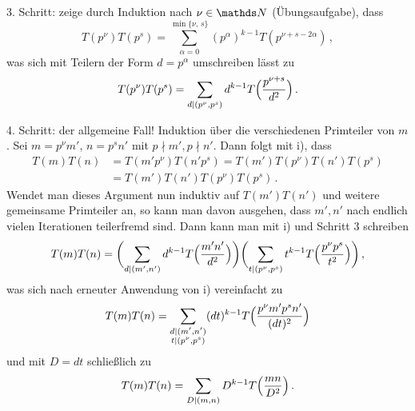 \begin{bewe}
	3. Schritt: zeige durch Induktion nach $\nu \in \NN$ (Übungsaufgabe), dass 
	\[
	T(p^\nu) T(p^s) = \sum_{\alpha = 0}^{\min \{\nu,\,s\}} (p^\alpha)^{k-1} T(p^{\nu + s - 2\alpha})
	\,,
	\]
	was sich mit Teilern der Form $d = p^\alpha$ umschreiben lässt zu
	\[
	T(p^\nu) T(p^s) = \sum_{d \vert (p^\nu, p^s)} d^{k-1} T\Bigl(\frac{p^{\nu + s}}{d^2}\Bigr)
	\,.
	\]
	
	4. Schritt: der allgemeine Fall! Induktion über die verschiedenen Primteiler von $m$. Sei $m = p^\nu m'$, $n = p^s n'$ mit $p \nmid m', p \nmid n'$. Dann folgt mit i), dass
	\begin{align*}
	T(m)T(n)
	&= T(m'p^\nu) T(n'p^s)
	= T(m')T(p^\nu)T(n')T(p^s) \\
	&= T(m')T(n') T(p^\nu) T(p^s)
	\,.
	\end{align*}
	Wendet man dieses Argument nun induktiv auf $T(m')T(n')$ und weitere gemeinsame Primteiler an, so kann man davon ausgehen, dass $m', n'$ nach endlich vielen Iterationen teilerfremd sind. Dann kann man mit i) und Schritt 3 schreiben
	\[
	T(m)T(n) = \biggl(\sum_{d \vert (m',n')} d^{k-1} T\Bigl(\frac {m'n'}{d^2}\Bigr)\biggr) \biggl(\sum_{t \vert (p^\nu, p^s)} t^{k-1} T\Bigl(\frac{p^\nu p^s}{t^2}\Bigr) \biggr)
	\,,
	\]
	was sich nach erneuter Anwendung von i) vereinfacht zu
	\[
	T(m)T(n) = \sum_{\substack{d \vert (m',n')\\t \vert (p^\nu, p^s)}} (dt)^{k-1} T\Bigl(\frac {p^\nu m'p^s n'}{(dt)^2}\Bigr)
	\]
	und mit $D = dt$ schließlich zu
	\[
	T(m)T(n) = \sum_{D \vert (m,n)} D^{k-1} T\Bigl(\frac {mn}{D^2}\Bigr)
	\,.
	\]
\end{bewe}
